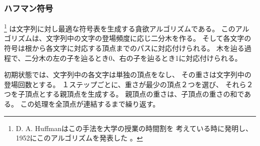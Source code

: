 \begin{comment}
\index{Huffman coding}

\subsubsection{Huffman coding}

\key{Huffman coding}\footnote{D. A. Huffman discovered this method
when solving a university course assignment
and published the algorithm in 1952 \cite{huf52}.} is a greedy algorithm
that constructs an optimal code for
compressing a given string.
The algorithm builds a binary tree
based on the frequencies of the characters
in the string,
and each character's codeword can be read
by following a path from the root to
the corresponding node.
A move to the left corresponds to bit 0,
and a move to the right corresponds to bit 1.
\end{comment}


\subsubsection{ハフマン符号}

\footnote{D. A. Huffmanはこの手法を大学の授業の時間割を
考えている時に発明し、1952にこのアルゴリズムを発表した \cite{huf52}。}
は文字列に対し最適な符号表を生成する貪欲アルゴリズムである。
このアルゴリズムは、文字列中の文字の登場頻度に応じ二分木を作る。
そして各文字の符号は根から各文字に対応する頂点までのパスに対応付けられる。
木を辿る過程で、二分木の左の子を辿るとき0、右の子を辿るとき1に対応付けられる。

\begin{comment}
Initially, each character of the string is
represented by a node whose weight is the
number of times the character occurs in the string.
Then at each step two nodes with minimum weights
are combined by creating
a new node whose weight is the sum of the weights
of the original nodes.
The process continues until all nodes have been combined.

Next we will see how Huffman coding creates
the optimal code for the string
\texttt{AABACDACA}.
Initially, there are four nodes that correspond
to the characters of the string:
\end{comment}

初期状態では、文字列中の各文字は単独の頂点をなし、
その重さは文字列中の登場回数とする。
１ステップごとに、重さが最少の頂点２つを選び、
それら２つを子頂点とする親頂点を生成する。
親頂点の重さは、子頂点の重さの和である。
この処理を全頂点が連結するまで繰り返す。

